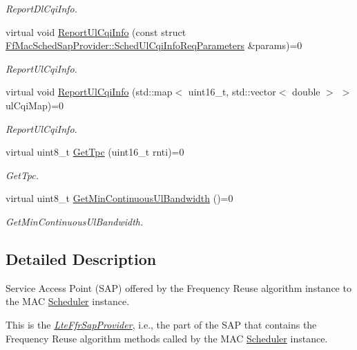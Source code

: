 \begin{DoxyCompactItemize}
\begin{DoxyCompactList}\small\item\em Report\+Dl\+Cqi\+Info. \end{DoxyCompactList}\item 
virtual void \hyperlink{classns3_1_1LteFfrSapProvider_a14e6bcaf7db6afcb42f75122717313b1}{Report\+Ul\+Cqi\+Info} (const struct \hyperlink{structns3_1_1FfMacSchedSapProvider_1_1SchedUlCqiInfoReqParameters}{Ff\+Mac\+Sched\+Sap\+Provider\+::\+Sched\+Ul\+Cqi\+Info\+Req\+Parameters} \&params)=0
\begin{DoxyCompactList}\small\item\em Report\+Ul\+Cqi\+Info. \end{DoxyCompactList}\item 
virtual void \hyperlink{classns3_1_1LteFfrSapProvider_a9a05b2fa50fcbe49f38b35b4db2a9d09}{Report\+Ul\+Cqi\+Info} (std\+::map$<$ uint16\+\_\+t, std\+::vector$<$ double $>$ $>$ ul\+Cqi\+Map)=0
\begin{DoxyCompactList}\small\item\em Report\+Ul\+Cqi\+Info. \end{DoxyCompactList}\item 
virtual uint8\+\_\+t \hyperlink{classns3_1_1LteFfrSapProvider_a0021d72c12fdaddd3817ef0eb5a7cd4e}{Get\+Tpc} (uint16\+\_\+t rnti)=0
\begin{DoxyCompactList}\small\item\em Get\+Tpc. \end{DoxyCompactList}\item 
virtual uint8\+\_\+t \hyperlink{classns3_1_1LteFfrSapProvider_a78c8a0c801d8a7d4f2e853f5138fd577}{Get\+Min\+Continuous\+Ul\+Bandwidth} ()=0
\begin{DoxyCompactList}\small\item\em Get\+Min\+Continuous\+Ul\+Bandwidth. \end{DoxyCompactList}\end{DoxyCompactItemize}


\subsection{Detailed Description}
Service Access Point (S\+AP) offered by the Frequency Reuse algorithm instance to the M\+AC \hyperlink{classns3_1_1Scheduler}{Scheduler} instance. 

This is the {\itshape \hyperlink{classns3_1_1LteFfrSapProvider}{Lte\+Ffr\+Sap\+Provider}}, i.\+e., the part of the S\+AP that contains the Frequency Reuse algorithm methods called by the M\+AC \hyperlink{classns3_1_1Scheduler}{Scheduler} instance. 

